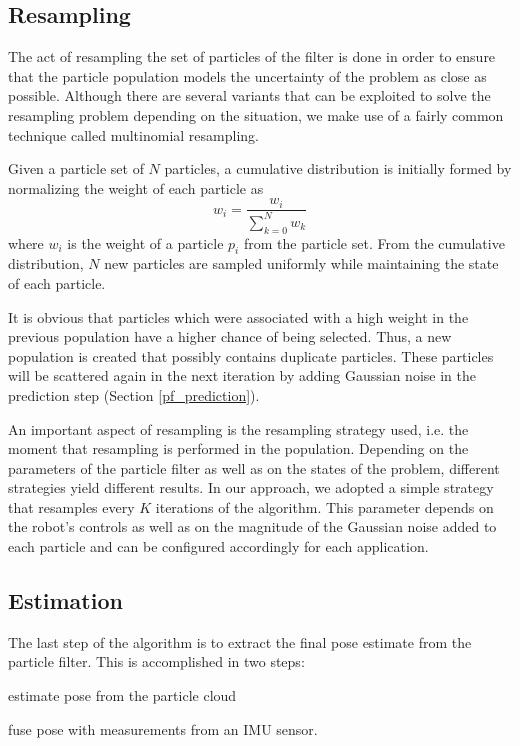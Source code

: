 \subsection{Resampling}

The act of resampling the set of particles of the filter is done
in order to ensure that the particle population models the
uncertainty of the problem as close as possible.
Although there are several variants that can be exploited to solve the
resampling problem depending on the situation, we make use of a fairly
common technique called multinomial resampling.

Given a particle set of $N$ particles, a cumulative distribution is
initially formed by normalizing the weight of each particle as
\begin{equation}
    w_i = \frac{w_i}{\sum\limits_{k=0}^N w_k}
\end{equation}
where $w_i$ is the weight of a particle $p_i$ from the particle set.
From the cumulative distribution, $N$ new particles are sampled
uniformly while maintaining the state of each particle.

It is obvious that particles which were associated with a high
weight in the previous population have a higher chance of being selected.
Thus, a new population is created that possibly contains duplicate
particles.
These particles will be scattered again in the next iteration by
adding Gaussian noise in the prediction step (Section \ref{pf_prediction}).

An important aspect of resampling is the resampling strategy used,
i.e. the moment that resampling is performed in the population.
Depending on the parameters of the particle filter as well as on the
states of the problem, different strategies yield different results.
In our approach, we adopted a simple strategy that resamples every
$K$ iterations of the algorithm.
This parameter depends on the robot's controls as well as on the magnitude of
the Gaussian noise added to each particle and can be configured
accordingly for each application.

\subsection{Estimation}

The last step of the algorithm is to extract the final pose estimate from
the particle filter. This is accomplished in two steps:
\begin{enumerate*}[label=(\roman*)]
    \item estimate pose from the particle cloud
    \item fuse pose with measurements from an IMU sensor.
\end{enumerate*}


